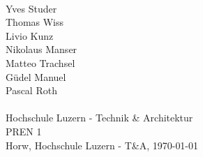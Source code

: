 \begin{titlepage}
    \begin{center}     
        \\
        \vspace*{1.2cm}
        Yves Studer\\
        Thomas Wiss\\
        Livio Kunz\\
        Nikolaus Manser\\
        Matteo Trachsel\\
        Güdel Manuel\\
        Pascal Roth\\
        \vspace*{1.2cm}
        {\Huge \myTitel}\\
        \vspace*{1cm}
        \vspace*{10cm}
        {\normalsize Hochschule Luzern - Technik \& Architektur}\\
        {\normalsize PREN 1}\\
        \vspace*{0.6cm}
        {\normalsize Horw, Hochschule Luzern - T\&A, \today}\\
    \end{center}
\end{titlepage}
